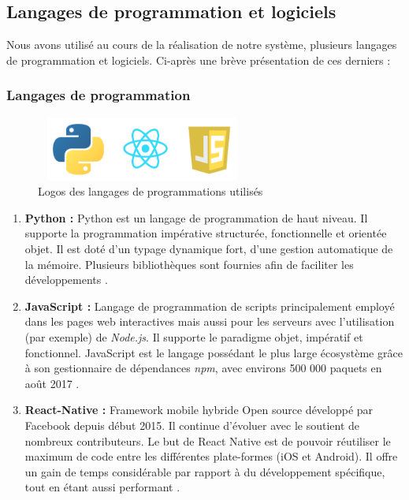 \subsection{Langages de programmation et logiciels}
    Nous avons utilisé au cours de la réalisation de notre système, plusieurs langages de programmation et logiciels. Ci-après une brève présentation de ces derniers :
        \subsubsection{Langages de programmation}
            \begin{figure}[H]
                    \centering
                    \includegraphics[height=60pt,width=200pt]{img/chapter4/tools/language.png}
                    \caption{Logos des langages de programmations utilisés}
                    \label{}
            \end{figure}
            \begin{enumerate}[leftmargin=*]
                \item{\textbf{Python : }}
                Python est un langage de programmation de haut niveau. Il supporte la programmation impérative structurée, fonctionnelle et orientée objet. Il est doté d'un typage dynamique fort, d'une gestion automatique de la mémoire. Plusieurs bibliothèques sont fournies afin de faciliter les développements \cite{python}.\\

                \item{\textbf{JavaScript : }}
                Langage de programmation de scripts principalement employé dans les pages web interactives mais aussi pour les serveurs avec l'utilisation (par exemple) de \emph{Node.js}. Il supporte le paradigme objet, impératif et fonctionnel. JavaScript est le langage possédant le plus large écosystème grâce à son gestionnaire de dépendances \emph{npm}, avec environs 500 000 paquets en août 2017 \cite{javascript}.\\

                \item{\textbf{React-Native : }}
                Framework mobile hybride Open source développé par Facebook depuis début 2015. Il continue d'évoluer avec le soutient de nombreux contributeurs. Le but de React Native est de pouvoir réutiliser le maximum de code entre les différentes plate-formes (iOS et Android). Il offre un gain de temps considérable par rapport à du développement spécifique, tout en étant aussi performant \cite{reactnative}.
            \end{enumerate}

